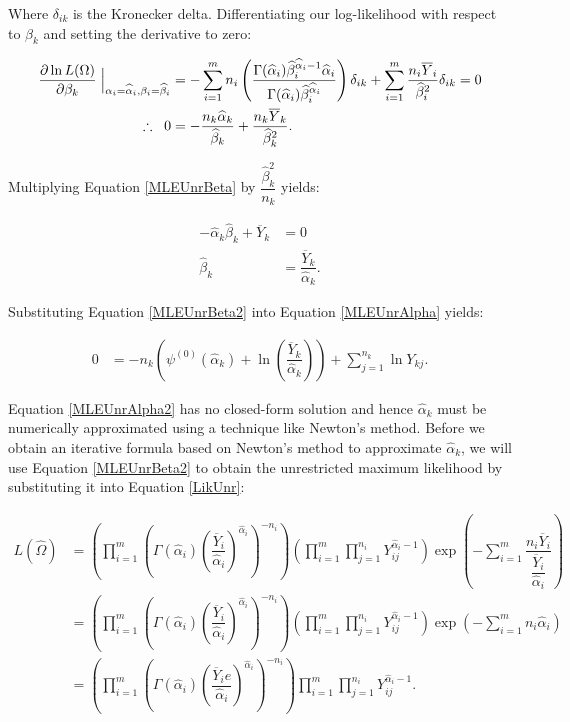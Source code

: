 \documentclass[12pt,a4paper]{article}
\newcommand{\eqn}[1]{Equation \ref{#1}}
\newcommand{\ovY}{\overline{Y}}
\newcommand{\wal}{\widehat{\alpha}}
\newcommand{\wbe}{\widehat{\beta}}
\begin{document}
	Where $\delta_{ik}$ is the Kronecker delta. Differentiating our log-likelihood with respect to $\beta_k$ and setting the derivative to zero:
	
	\begin{align}
		\dfrac{\partial \ln{L(\Omega)}}{\partial \beta_k} \Bigm \lvert_{\alpha_i=\wal_i, \beta_i=\wbe_i} &= -\sum_{i=1}^m n_i \left(\dfrac{\Gamma(\wal_i)\wbe_i^{\wal_i-1}\wal_i}{\Gamma(\wal_i)\wbe_i^{\wal_i}}\right)\delta_{ik} + \sum_{i=1}^m \dfrac{n_i \ovY_i}{\wbe_i^2}\delta_{ik} = 0 \nonumber\\
		\therefore \hspace{0.2cm} 0 &= -\dfrac{n_k \wal_k}{\wbe_k} + \dfrac{n_k\ovY_k}{\wbe_k^2}. \label{MLEUnrBeta}
	\end{align}

	Multiplying \eqn{MLEUnrBeta} by $\dfrac{\wbe_k^2}{n_k}$ yields:
	
	\begin{align}
		-\wal_k \wbe_k + \ovY_k &= 0 \nonumber\\
		\wbe_k &= \dfrac{\ovY_k}{\wal_k}. \label{MLEUnrBeta2}
	\end{align}

	Substituting \eqn{MLEUnrBeta2} into \eqn{MLEUnrAlpha} yields:
	
	\begin{align}
		0 &= -n_k \left(\psi^{(0)}(\wal_k) + \ln{\left(\dfrac{\ovY_k}{\wal_k}\right)}\right) + \sum_{j=1}^{n_k} \ln{Y_{kj}}.\label{MLEUnrAlpha2}
	\end{align}

	\eqn{MLEUnrAlpha2} has no closed-form solution and hence $\wal_k$ must be numerically approximated using a technique like Newton's method. Before we obtain an iterative formula based on Newton's method to approximate $\wal_k$, we will use \eqn{MLEUnrBeta2} to obtain the unrestricted maximum likelihood by substituting it into \eqn{LikUnr}:
	
	\begin{align}
		L(\widehat{\Omega}) &= \left(\prod_{i=1}^m\left(\Gamma(\wal_i)\left(\dfrac{\ovY_i}{\wal_i}\right)^{\wal_i}\right)^{-n_i}\right) \left(\prod_{i=1}^m \prod_{j=1}^{n_i} Y_{ij}^{\wal_i-1}\right) \exp\left(-\sum_{i=1}^m \dfrac{n_i\ovY_i}{\dfrac{\ovY_i}{\wal_i}}\right) \nonumber\\
		&= \left(\prod_{i=1}^m\left(\Gamma(\wal_i)\left(\dfrac{\ovY_i}{\wal_i}\right)^{\wal_i}\right)^{-n_i}\right) \left(\prod_{i=1}^m \prod_{j=1}^{n_i} Y_{ij}^{\wal_i-1}\right) \exp\left(-\sum_{i=1}^m n_i\wal_i\right) \nonumber\\
		&= \left(\prod_{i=1}^m\left(\Gamma(\wal_i)\left(\dfrac{\ovY_i e}{\wal_i}\right)^{\wal_i}\right)^{-n_i}\right) \prod_{i=1}^m \prod_{j=1}^{n_i} Y_{ij}^{\wal_i-1}. \label{MLUnr}
	\end{align}
\end{document}

